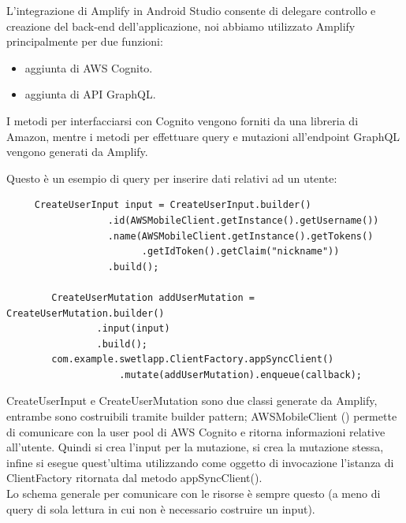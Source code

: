 L'integrazione di Amplify in Android Studio consente di delegare controllo e creazione del back-end dell'applicazione, noi abbiamo utilizzato Amplify principalmente per due funzioni:

\begin{itemize}
    \item aggiunta di AWS Cognito.
    \item aggiunta di API GraphQL.
\end{itemize}

I metodi per interfacciarsi con Cognito vengono forniti da una libreria di Amazon, mentre i metodi per effettuare query e mutazioni all'endpoint GraphQL vengono generati da Amplify.


Questo è un esempio di query per inserire dati relativi ad un utente:

\begin{verbatim}
     CreateUserInput input = CreateUserInput.builder()
                  .id(AWSMobileClient.getInstance().getUsername())
                  .name(AWSMobileClient.getInstance().getTokens()
                  		.getIdToken().getClaim("nickname"))
                  .build();

        CreateUserMutation addUserMutation = CreateUserMutation.builder()
                .input(input)
                .build();
        com.example.swetlapp.ClientFactory.appSyncClient()
        			.mutate(addUserMutation).enqueue(callback);
\end{verbatim}

CreateUserInput e CreateUserMutation sono due classi generate da Amplify, entrambe sono costruibili tramite builder pattern; AWSMobileClient () permette di comunicare con la user pool di AWS Cognito e ritorna informazioni relative all'utente. Quindi si crea l'input per la mutazione, si crea la mutazione stessa, infine si esegue quest'ultima utilizzando come oggetto di invocazione l'istanza di ClientFactory ritornata dal metodo appSyncClient().\\
Lo schema generale per comunicare con le risorse è sempre questo (a meno di query di sola lettura in cui non è necessario costruire un input).

